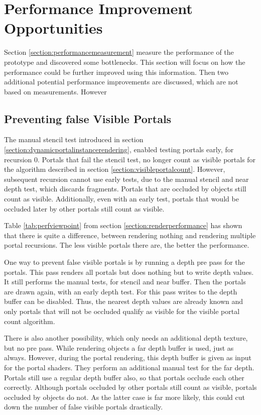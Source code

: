 \chapter{Performance Improvement Opportunities}
\label{section:performanceimprovements}

Section \ref{section:performancemeasurement} measure the performance of the prototype and discovered some bottlenecks. This section will focus on how the performance could be further improved using this information. Then two additional potential performance improvements are discussed, which are not based on measurements. However

\section{Preventing false Visible Portals}
\label{section:falsevisible}
The manual stencil test introduced in section \ref{section:dynamicportalinstancerendering}, enabled testing portals early, for recursion 0. Portals that fail the stencil test, no longer count as visible portals for the algorithm described in section \ref{section:visibleportalcount}. However, subsequent recursion cannot use early tests, due to the manual stencil and near depth test, which discards fragments. Portals that are occluded by objects still count as visible. Additionally, even with an early test, portals that would be occluded later by other portals still count as visible.

Table \ref{tab:perfviewpoint} from section \ref{section:renderperformance} has shown that there is quite a difference, between rendering nothing and rendering multiple portal recursions. The less visible portals there are, the better the performance.


One way to prevent false visible portals is by running a depth pre pass for the portals. This pass renders all portals but does nothing but to write depth values. It still performs the manual tests, for stencil and near buffer. Then the portals are drawn again, with an early depth test. For this pass writes to the depth buffer can be disabled. Thus, the nearest depth values are already known and only portals that will not be occluded qualify as visible for the visible portal count algorithm.

There is also another possibility, which only needs an additional depth texture, but no pre pass. While rendering objects a far depth buffer is used, just as always. However, during the portal rendering, this depth buffer is given as input for the portal shaders. They perform an additional manual test for the far depth. Portals still use a regular depth buffer also, so that portals occlude each other correctly. Although portals occluded by other portals still count as visible, portals occluded by objects do not. As the latter case is far more likely, this could cut down the number of false visible portals drastically.




